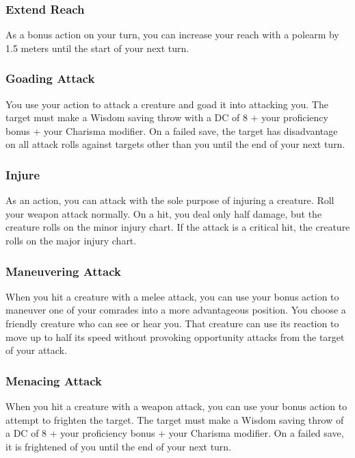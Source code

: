 \subsubsection{Extend Reach} \label{tec::extendreach}
As a bonus action on your turn, you can increase your reach with a polearm by 1.5 meters until the start of your next turn.

\subsubsection{Goading Attack} \label{tec::goadingattack}
You use your action to attack a creature and goad it into attacking you.
The target must make a Wisdom saving throw with a DC of 8 + your proficiency bonus + your Charisma modifier.
On a failed save, the target has disadvantage on all attack rolls against targets other than you until the end of your next turn.

\subsubsection{Injure} \label{tec::injure}
As an action, you can attack with the sole purpose of injuring a creature.
Roll your weapon attack normally.
On a hit, you deal only half damage, but the creature rolls on the minor injury chart.
If the attack is a critical hit, the creature rolls on the major injury chart.

\subsubsection{Maneuvering Attack} \label{tec::maneuveringattack}
When you hit a creature with a melee attack, you can use your bonus action to maneuver one of your comrades into a more advantageous position.
You choose a friendly creature who can see or hear you.
That creature can use its reaction to move up to half its speed without provoking opportunity attacks from the target of your attack.

\subsubsection{Menacing Attack} \label{tec::menacingattack}
When you hit a creature with a weapon attack, you can use your bonus action to attempt to frighten the target.
The target must make a Wisdom saving throw of a DC of 8 + your proficiency bonus + your Charisma modifier.
On a failed save, it is frightened of you until the end of your next turn.

